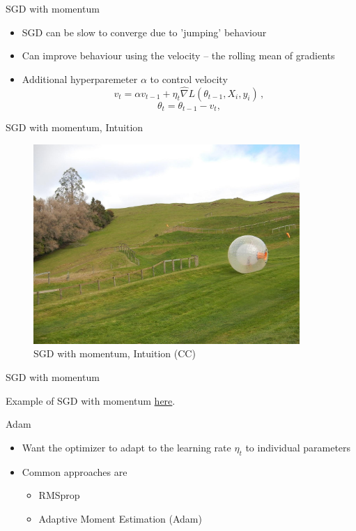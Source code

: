 \documentclass[10pt,handout]{beamer}
\begin{document}
\begin{frame}{SGD with momentum}

\begin{itemize}
\item SGD can be slow to converge due to 'jumping' behaviour
\item Can improve behaviour using the velocity -- the rolling mean of gradients
\item Additional hyperparemeter $\alpha$ to control velocity
\[
v_t = \alpha v_{t-1} + \eta_t \hat{\nabla} L(\theta_{t-1}, X_{i}, y_{i})\,,
\]
\[
\theta_t = \theta_{t-1} - v_t,
\]

\end{itemize}


\end{frame}


\begin{frame}{SGD with momentum, Intuition}

\begin{figure}[h]
\caption{SGD with momentum, Intuition (CC)}
\centering
\includegraphics[width=0.9\textwidth]{figs/zorb}
\end{figure}

\end{frame}

\begin{frame}{SGD with momentum}

Example of SGD with momentum \href{https://distill.pub/2017/momentum/}{here}.

\end{frame}


\begin{frame}{Adam}

\begin{itemize}
\item Want the optimizer to adapt to the learning rate $\eta_t$ to individual parameters
\item Common approaches are
\begin{itemize}
\item RMSprop
\item Adaptive Moment Estimation (Adam)
\end{itemize}
\end{itemize}

\end{frame}
\end{document}
